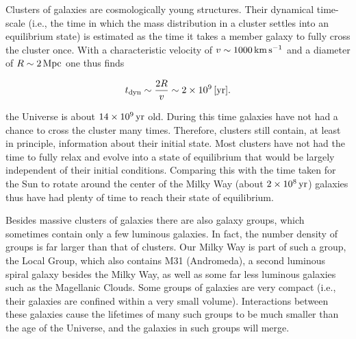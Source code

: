 \documentclass[a4paper,10pt]{article}
\begin{document}
{\noindent}Clusters of galaxies are cosmologically young structures. Their dynamical time-scale (i.e., the time in which the mass distribution in a cluster settles into an equilibrium state) is estimated as the time it takes a member galaxy to fully cross the cluster once. With a characteristic velocity of $v\sim1000\,{\rm km\,s^{-1}}$ and a diameter of $R\sim2\,{\rm Mpc}$ one thus finds

\begin{align*}
    t_\mathrm{dyn} \sim \frac{2R}{v} \sim 2\times10^9\,[{\rm yr}].
\end{align*}

{\noindent}the Universe is about $14\times10^9\,{\rm yr}$ old. During this time galaxies have not had a chance to cross the cluster many times. Therefore, clusters still contain, at least in principle, information about their initial state. Most clusters have not had the time to fully relax and evolve into a state of equilibrium that would be largely independent of their initial conditions. Comparing this with the time taken for the Sun to rotate around the center of the Milky Way (about $2\times10^8\,{\rm yr}$) galaxies thus have had plenty of time to reach their state of equilibrium.

{\noindent}Besides massive clusters of galaxies there are also galaxy groups, which sometimes contain only a few luminous galaxies. In fact, the number density of groups is far larger than that of clusters. Our Milky Way is part of such a group, the Local Group, which also contains M31 (Andromeda), a second luminous spiral galaxy besides the Milky Way, as well as some far less luminous galaxies such as the Magellanic Clouds. Some groups of galaxies are very compact (i.e., their galaxies are confined within a very small volume). Interactions between these galaxies cause the lifetimes of many such groups to be much smaller than the age of the Universe, and the galaxies in such groups will merge.
\end{document}
